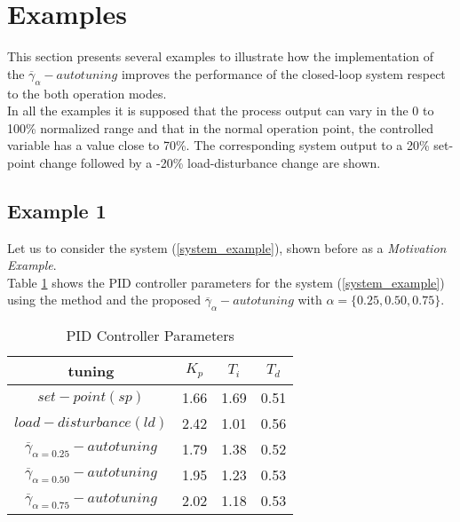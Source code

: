 %
\section{Examples}
\label{example}
%

This section presents several examples to illustrate how the
implementation of the $\overline{\gamma}_{\alpha}-autotuning$
improves the performance of the closed-loop system respect to the
both operation modes.\\

In all the examples it is supposed that the process output can
vary in the 0 to 100\% normalized range and that in the normal
operation point, the controlled variable has a value close to
70\%. The corresponding system output to a 20\% set-point change
followed by a -20\% load-disturbance change are shown.

\subsection{Example 1}

Let us to consider the system (\ref{system_example}), shown before
as a \emph{Motivation Example}.\\

Table \ref{PID_parameters} shows the PID controller parameters for
the system (\ref{system_example}) using the
\cite{zhuangAthertonIEE1993} method and the proposed
$\overline{\gamma}_{\alpha}-autotuning$ with $\alpha=\{0.25, 0.50,
0.75\}$.\\

\begin{table}[h!]
\begin{center}
\caption{PID Controller Parameters}
\begin{tabular}{c|ccc}
\hline \textbf{tuning}               &$K_p$ &$T_i$ &$T_d$\\ \hline
$set-point(sp)$                               &1.66  &1.69  &0.51 \\
$load-disturbance(ld)$                        &2.42  &1.01  &0.56 \\
$\overline{\gamma}_{\alpha=0.25}-autotuning$  &1.79  &1.38  &0.52 \\
$\overline{\gamma}_{\alpha=0.50}-autotuning$  &1.95  &1.23  &0.53 \\
$\overline{\gamma}_{\alpha=0.75}-autotuning$  &2.02  &1.18  &0.53 \\
\hline
\end{tabular}
\label{PID_parameters}
\end{center}
\end{table}

